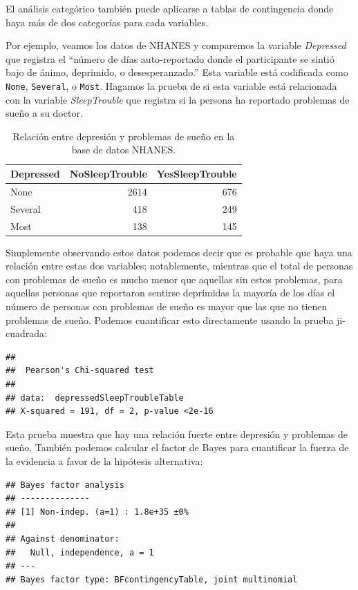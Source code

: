 \documentclass[
  12pt,
]{book}
\begin{document}
El análisis categórico también puede aplicarse a tablas de contingencia donde haya más de dos categorías para cada variables.

Por ejemplo, veamos los datos de NHANES y comparemos la variable \emph{Depressed} que registra el ``número de días auto-reportado donde el participante se sintió bajo de ánimo, deprimido, o desesperanzado.'' Esta variable está codificada como \texttt{None}, \texttt{Several}, o \texttt{Most}. Hagamos la prueba de si esta variable está relacionada con la variable \emph{SleepTrouble} que registra si la persona ha reportado problemas de sueño a su doctor.

\begin{table}

\caption{\label{tab:unnamed-chunk-81}Relación entre depresión y problemas de sueño en la base de datos NHANES.}
\centering
\begin{tabular}[t]{l|r|r}
\hline
Depressed & NoSleepTrouble & YesSleepTrouble\\
\hline
None & 2614 & 676\\
\hline
Several & 418 & 249\\
\hline
Most & 138 & 145\\
\hline
\end{tabular}
\end{table}

Simplemente observando estos datos podemos decir que es probable que haya una relación entre estas dos variables; notablemente, mientras que el total de personas con problemas de sueño es mucho menor que aquellas sin estos problemas, para aquellas personas que reportaron sentirse deprimidas la mayoría de los días el número de personas con problemas de sueño es mayor que las que no tienen problemas de sueño. Podemos cuantificar esto directamente usando la prueba ji-cuadrada:

\begin{verbatim}
## 
## 	Pearson's Chi-squared test
## 
## data:  depressedSleepTroubleTable
## X-squared = 191, df = 2, p-value <2e-16
\end{verbatim}

Esta prueba muestra que hay una relación fuerte entre depresión y problemas de sueño. También podemos calcular el factor de Bayes para cuantificar la fuerza de la evidencia a favor de la hipótesis alternativa:

\begin{verbatim}
## Bayes factor analysis
## --------------
## [1] Non-indep. (a=1) : 1.8e+35 ±0%
## 
## Against denominator:
##   Null, independence, a = 1 
## ---
## Bayes factor type: BFcontingencyTable, joint multinomial
\end{verbatim}
\end{document}
